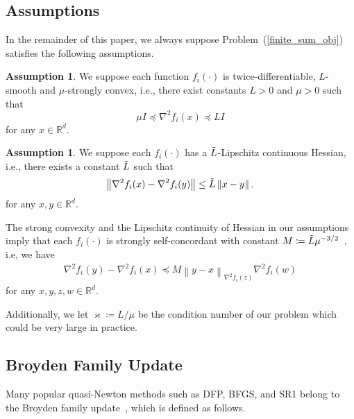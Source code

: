 \documentclass[letterpaper]{article} %
\theoremstyle{plain}
\theoremstyle{definition}
\newtheorem{assumption}[theorem]{Assumption}
\theoremstyle{remark}
\newcommand\norm[1]{\left\lVert#1\right\rVert}
\def\BR{{\mathbb{R}}}
\begin{document}
\subsection{Assumptions}

In the remainder of this paper, we always suppose Problem~(\ref{finite_sum_obj}) satisfies the following assumptions.

\begin{assumption}\label{convex_assumption}
We suppose each function $f_i(\cdot)$ is twice-differentiable, $L$-smooth and $\mu$-strongly convex, i.e., there exist constants $L > 0$ and $\mu > 0$ such that 
\begin{equation}\label{eq:strong_convex}
    \mu I \preceq \nabla^2 f_i (x) \preceq L I  
\end{equation}
for any $x\in\BR^d$.
\end{assumption}

\begin{assumption}\label{smooth_assumption}
    We suppose each $f_i(\cdot)$ has a $\Tilde{L}$-Lipschitz continuous Hessian, i.e., there exists a constant $\Tilde{L}$ such that 
    \begin{equation*}
        \norm{\nabla^2 f_i(x) - \nabla^2 f_i(y)} \leq \Tilde{L} \norm{x - y}.
    \end{equation*}
    for any $x, y \in \BR^d$.
\end{assumption}

The strong convexity and the Lipschitz continuity of Hessian in our assumptions imply that each $f_i(\cdot)$ is strongly self-concordant with constant $M \coloneqq\Tilde{L} \mu^{-3/2}$~\cite{rodomanov2021greedy}, i.e, we have
\begin{align*}
\nabla^2 f_i(y) - \nabla^2 f_i(x) \preceq M \norm{y - x}_{\nabla^2 f_i(z)} \nabla^2 f_i(w)    
\end{align*}
for any $x,y,z,w \in \BR^d$.

Additionally, we let $\varkappa\coloneqq L/\mu$ be the condition number of our problem which could be very large in practice.

\subsection{Broyden Family Update}

Many popular quasi-Newton methods such as DFP, BFGS, and SR1 belong to the Broyden family update~\cite[Section 6.3]{nocedal1999numerical}, which is defined as follows.

\end{document}
